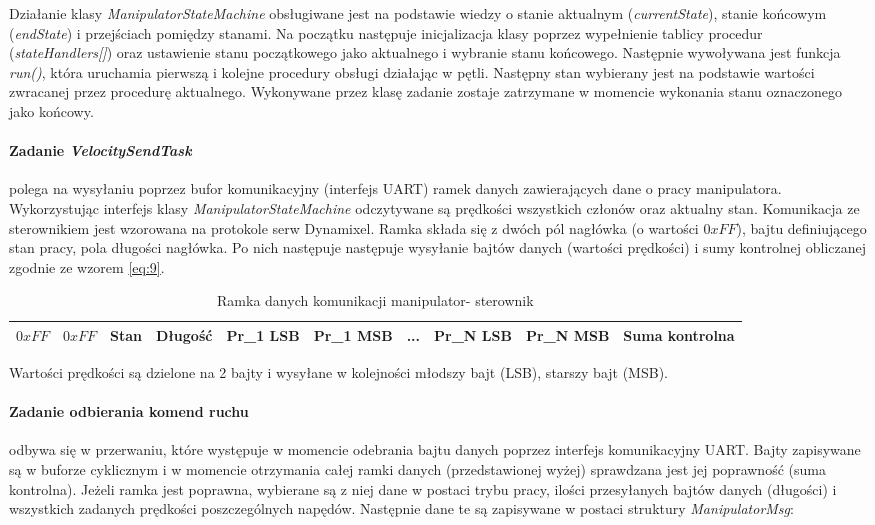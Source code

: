 \documentclass[a4paper, 12pt, twoside]{article}
\begin{document}
Działanie klasy \textit{ManipulatorStateMachine} obsługiwane jest na podstawie wiedzy o stanie aktualnym (\textit{currentState}), stanie końcowym (\textit{endState}) i przejściach pomiędzy stanami. Na początku następuje inicjalizacja klasy poprzez wypełnienie tablicy procedur (\textit{stateHandlers[]}) oraz ustawienie stanu początkowego jako aktualnego i wybranie stanu końcowego. Następnie wywoływana jest funkcja \textit{run()}, która uruchamia pierwszą i kolejne procedury obsługi działając w pętli. Następny stan wybierany jest na podstawie wartości zwracanej przez procedurę aktualnego. Wykonywane przez klasę zadanie zostaje zatrzymane w momencie wykonania stanu oznaczonego jako końcowy.

\paragraph{Zadanie \textit{VelocitySendTask}} polega na wysyłaniu poprzez bufor komunikacyjny (interfejs UART) ramek danych zawierających dane o pracy manipulatora. Wykorzystując interfejs klasy \textit{ManipulatorStateMachine} odczytywane są prędkości wszystkich członów oraz aktualny stan. Komunikacja ze sterownikiem jest wzorowana na protokole serw Dynamixel. Ramka składa się z dwóch pól nagłówka (o wartości $0xFF$), bajtu definiującego stan pracy, pola długości nagłówka. Po nich następuje następuje wysyłanie bajtów danych (wartości prędkości) i sumy kontrolnej obliczanej zgodnie ze wzorem \ref{eq:9}. 

\begin{table}[htb!]
\label{comm}
\begin{center}
\caption{Ramka danych komunikacji manipulator- sterownik }
\begin{tabular}{ | c | c | c | c | c | c | c | c | c | c | }
\hline
 $0xFF$ & $0xFF$ & Stan & Długość & Pr\_1 LSB & Pr\_1 MSB & ... & Pr\_N LSB & Pr\_N MSB & Suma kontrolna \\ 
\hline
\end{tabular}
\end{center}
\end{table}

Wartości prędkości są dzielone na 2 bajty i wysyłane w kolejności młodszy bajt (LSB), starszy bajt (MSB).

\paragraph{Zadanie odbierania komend ruchu} odbywa się w przerwaniu, które występuje w momencie odebrania bajtu danych poprzez interfejs komunikacyjny UART. Bajty zapisywane są w buforze cyklicznym i w momencie otrzymania całej ramki danych (przedstawionej wyżej) sprawdzana jest jej poprawność (suma kontrolna). Jeżeli ramka jest poprawna, wybierane są z niej dane w postaci trybu pracy, ilości przesyłanych bajtów danych (długości) i wszystkich zadanych prędkości poszczególnych napędów. Następnie dane te są zapisywane w postaci struktury \textit{ManipulatorMsg}:
\end{document}
